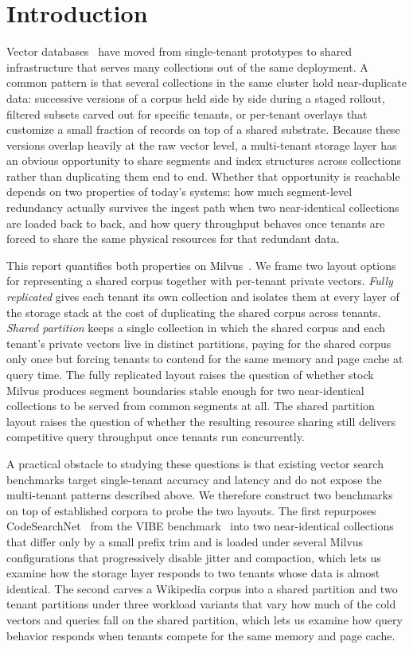 \section{Introduction}

Vector databases~\cite{wang2021milvus, pan2024survey} have moved
from single-tenant prototypes to shared infrastructure that serves
many collections out of the same deployment. A common pattern is
that several collections in the same cluster hold near-duplicate
data: successive versions of a corpus held side by side during a
staged rollout, filtered subsets carved out for specific tenants, or
per-tenant overlays that customize a small fraction of records on
top of a shared substrate. Because these versions overlap heavily
at the raw vector level, a multi-tenant storage layer has an
obvious opportunity to share segments and index structures across
collections rather than duplicating them end to end. Whether that
opportunity is reachable depends on two properties of today's
systems: how much segment-level redundancy actually survives the
ingest path when two near-identical collections are loaded back to
back, and how query throughput behaves once tenants are forced to
share the same physical resources for that redundant data.

This report quantifies both properties on
Milvus~\cite{wang2021milvus}. We frame two layout options for
representing a shared corpus together with per-tenant private
vectors. \emph{Fully replicated} gives each tenant its own collection
and isolates them at every layer of the storage stack at the cost
of duplicating the shared corpus across tenants. \emph{Shared
partition} keeps a single collection in which the shared corpus
and each tenant's private vectors live in distinct partitions, paying
for the shared corpus only once but forcing tenants to contend for
the same memory and page cache at query time. The fully replicated
layout raises the question of whether stock Milvus produces
segment boundaries stable enough for two near-identical collections
to be served from common segments at all. The shared partition
layout raises the question of whether the resulting resource
sharing still delivers competitive query throughput once tenants
run concurrently.

A practical obstacle to studying these questions is that existing
vector search benchmarks target single-tenant accuracy and latency
and do not expose the multi-tenant patterns described above. We
therefore construct two benchmarks on top of established corpora
to probe the two layouts. The first repurposes
CodeSearchNet~\cite{husain2019codesearchnet} from the VIBE
benchmark~\cite{vibe2024} into two near-identical collections that
differ only by a small prefix trim and is loaded under several
Milvus configurations that progressively disable jitter and
compaction, which lets us examine how the storage layer responds
to two tenants whose data is almost identical. The second carves a
Wikipedia corpus into a shared partition and two tenant partitions
under three workload variants that vary how much of the cold
vectors and queries fall on the shared partition, which lets us
examine how query behavior responds when tenants compete for the
same memory and page cache.

